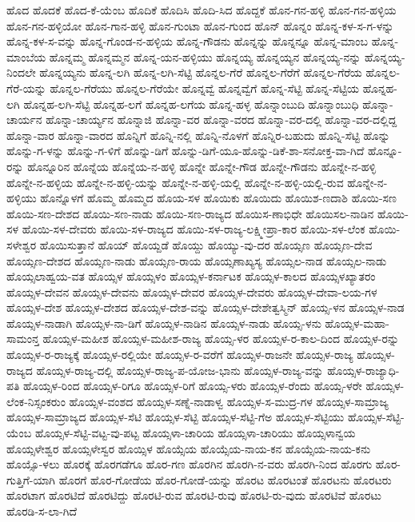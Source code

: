 ಹೊದ
ಹೊದಕೆ
ಹೊದ-ಕೆ-ಯೆಂಬ
ಹೊದಿಕೆ
ಹೊದಿಸಿ
ಹೊದಿ-ಸಿದ
ಹೊದ್ದಕೆ
ಹೊನ-ಗನ-ಹಳ್ಳಿ
ಹೊನ-ಗನ-ಹಳ್ಳಿಯ
ಹೊನ-ಗನ-ಹಳ್ಳಿಯೋ
ಹೊನ-ಗಾನ-ಹಳ್ಳಿ
ಹೊನ-ಗುಂಟಾ
ಹೊನ-ಗುಂದ
ಹೊನ್
ಹೊನ್ನಂ
ಹೊನ್ನ-ಕಳ-ಸ-ಗ-ಳನ್ನು
ಹೊನ್ನ-ಕಳ-ಸ-ವನ್ನು
ಹೊನ್ನ-ಗೊಂಡ-ನ-ಹಳ್ಳಿಯ
ಹೊನ್ನ-ಗೌಡನು
ಹೊನ್ನನ್ನು
ಹೊನ್ನನ್ನೂ
ಹೊನ್ನ-ಮಾಂಬ
ಹೊನ್ನ-ಮಾಂಬೆಯ
ಹೊನ್ನಮ್ಮ
ಹೊನ್ನಮ್ಮನ
ಹೊನ್ನ-ಯನ-ಹಳ್ಳಿಯು
ಹೊನ್ನಯ್ಯ
ಹೊನ್ನಯ್ಯನ
ಹೊನ್ನಯ್ಯ-ನನ್ನು
ಹೊನ್ನಯ್ಯ-ನಿಂದಲೇ
ಹೊನ್ನಯ್ಯನು
ಹೊನ್ನ-ಲಗಿ
ಹೊನ್ನ-ಲಗಿ-ಸೆಟ್ಟಿ
ಹೊನ್ನಲ-ಗೆರೆ
ಹೊನ್ನಲ-ಗೆರೆಗೆ
ಹೊನ್ನಲ-ಗೆರೆಯ
ಹೊನ್ನಲ-ಗೆರೆ-ಯನ್ನು
ಹೊನ್ನಲ-ಗೆರೆಯು
ಹೊನ್ನಲ-ಗೆರೆಯೇ
ಹೊನ್ನವ್ವೆ
ಹೊನ್ನವ್ವೆಗೆ
ಹೊನ್ನ-ಸೆಟ್ಟಿ
ಹೊನ್ನ-ಸೆಟ್ಟಿಯ
ಹೊನ್ನಹ-ಲಗಿ
ಹೊನ್ನಹ-ಲಗಿ-ಸೆಟ್ಟಿ
ಹೊನ್ನಹ-ಲಗೆ
ಹೊನ್ನಹ-ಲಗೆಯ
ಹೊನ್ನ-ಹಳ್ಳ
ಹೊನ್ನಾಂಬುದಿ
ಹೊನ್ನಾಂಬುಧಿ
ಹೊನ್ನಾ-ಚಾರ್ಯನ
ಹೊನ್ನಾ-ಚಾರ್ಯ್ಯನ
ಹೊನ್ನಾಜಿ
ಹೊನ್ನಾ-ವರ
ಹೊನ್ನಾ-ವರದ
ಹೊನ್ನಾ-ವರ-ದಲ್ಲಿ
ಹೊನ್ನಾ-ವರ-ದಲ್ಲಿದ್ದ
ಹೊನ್ನಾ-ವಾರ
ಹೊನ್ನಾ-ವಾರದ
ಹೊನ್ನಿಗೆ
ಹೊನ್ನಿ-ನಲ್ಲಿ
ಹೊನ್ನಿ-ನೊಳಗೆ
ಹೊನ್ನಿರ-ಬಹುದು
ಹೊನ್ನಿ-ಸೆಟ್ಟಿ
ಹೊನ್ನು
ಹೊನ್ನು-ಗ-ಳನ್ನು
ಹೊನ್ನು-ಗ-ಳಿಗೆ
ಹೊನ್ನು-ಡಿಗೆ
ಹೊನ್ನು-ಡಿಗೆ-ಯೂ-ಹೊನ್ನು-ಡಿಕೆ-ಶಾ-ಸನೋಕ್ತ-ವಾ-ಗಿದೆ
ಹೊನ್ನೂ-ರನ್ನು
ಹೊನ್ನೂರಿನ
ಹೊನ್ನೆಯ
ಹೊನ್ನೆಯ-ನ-ಹಳ್ಳಿ
ಹೊನ್ನೇ
ಹೊನ್ನೇ-ಗೌಡ
ಹೊನ್ನೇ-ಗೌಡನು
ಹೊನ್ನೇ-ನ-ಹಳ್ಳಿ
ಹೊನ್ನೇ-ನ-ಹಳ್ಳಿಯ
ಹೊನ್ನೇ-ನ-ಹಳ್ಳಿ-ಯನ್ನು
ಹೊನ್ನೇ-ನ-ಹಳ್ಳಿ-ಯಲ್ಲಿ
ಹೊನ್ನೇ-ನ-ಹಳ್ಳಿ-ಯಲ್ಲಿ-ರುವ
ಹೊನ್ನೇ-ನ-ಹಳ್ಳಿಯು
ಹೊನ್ನೊಳಗೆ
ಹೊಮ್ಮ
ಹೊಮ್ಮದ
ಹೊಯ-ಸಳ
ಹೊಯಿಕು
ಹೊಯಿದು
ಹೊಯಿಶ-ಣದಾಶಿ
ಹೊಯಿ-ಸಣ
ಹೊಯಿ-ಸಣ-ದೇಶದ
ಹೊಯಿ-ಸಣ-ನಾಡು
ಹೊಯಿ-ಸಣ-ರಾಜ್ಯದ
ಹೊಯಿಸ-ಣಾಭಿಧೇ
ಹೊಯಿಸಲ-ನಾಡಿನ
ಹೊಯಿ-ಸಳ
ಹೊಯಿ-ಸಳ-ದೇವರು
ಹೊಯಿ-ಸಳ-ರಾಜ್ಯದ
ಹೊಯಿ-ಸಳ-ರಾಜ್ಯ-ಲಕ್ಷ್ಮೀಪ್ರಾ-ಕಾರ
ಹೊಯಿ-ಸಳ-ಲೆಂಕ
ಹೊಯಿ-ಸಳೇಶ್ವರ
ಹೊಯಿಸುತ್ತಾನೆ
ಹೊಯ್
ಹೊಯ್ದಡೆ
ಹೊಯ್ದು
ಹೊಯ್ಯು-ವು-ದರ
ಹೊಯ್ಸಣ
ಹೊಯ್ಸಣ-ದೇವ
ಹೊಯ್ಸಣ-ದೇಶದ
ಹೊಯ್ಸಣ-ನಾಡು
ಹೊಯ್ಸಣ-ರಾಯ
ಹೊಯ್ಸಣಾಖ್ಯಸ್ಯ
ಹೊಯ್ಸಲ-ನಾಡ
ಹೊಯ್ಸಲ-ನಾಡು
ಹೊಯ್ಸಲಾಹ್ವಯ-ವತ
ಹೊಯ್ಸಳ
ಹೊಯ್ಸಳಂ
ಹೊಯ್ಸಳ-ಕರ್ನಾಟಕ
ಹೊಯ್ಸಳ-ಕಾಲದ
ಹೊಯ್ಸಳಖ್ಯಾತರಂ
ಹೊಯ್ಸಳ-ದೇವನ
ಹೊಯ್ಸಳ-ದೇವನು
ಹೊಯ್ಸಳ-ದೇವರ
ಹೊಯ್ಸಳ-ದೇವರು
ಹೊಯ್ಸಳ-ದೇವಾ-ಲಯ-ಗಳ
ಹೊಯ್ಸಳ-ದೇಶ
ಹೊಯ್ಸಳ-ದೇಶದ
ಹೊಯ್ಸಳ-ದೇಶ-ವನ್ನು
ಹೊಯ್ಸಳ-ದೇಶೇತ್ವಸ್ಮಿನ್
ಹೊಯ್ಸ-ಳನ
ಹೊಯ್ಸಳ-ನಾಡ
ಹೊಯ್ಸಳ-ನಾಡಾಗಿ
ಹೊಯ್ಸಳ-ನಾ-ಡಿಗೆ
ಹೊಯ್ಸಳ-ನಾಡಿನ
ಹೊಯ್ಸಳ-ನಾಡು
ಹೊಯ್ಸ-ಳನು
ಹೊಯ್ಸಳ-ಮಹಾ-ಸಾಮಂನ್ತ
ಹೊಯ್ಸಳ-ಮಹೀಶ
ಹೊಯ್ಸಳ-ಮಹೀಶ-ರಾಜ್ಯ
ಹೊಯ್ಸ-ಳರ
ಹೊಯ್ಸಳ-ರ-ಕಾಲ-ದಿಂದ
ಹೊಯ್ಸಳ-ರನ್ನು
ಹೊಯ್ಸಳ-ರ-ರಾಜ್ಯಕ್ಕೆ
ಹೊಯ್ಸಳ-ರಲ್ಲಿಯೇ
ಹೊಯ್ಸಳ-ರ-ವರೆಗೆ
ಹೊಯ್ಸಳ-ರಾಜನೇ
ಹೊಯ್ಸಳ-ರಾಜ್ಯ
ಹೊಯ್ಸಳ-ರಾಜ್ಯದ
ಹೊಯ್ಸಳ-ರಾಜ್ಯ-ದಲ್ಲಿ
ಹೊಯ್ಸಳ-ರಾಜ್ಯ-ಪ-ಯೋಜ-ಭಾನು
ಹೊಯ್ಸಳ-ರಾಜ್ಯ-ವನ್ನು
ಹೊಯ್ಸಳ-ರಾಜ್ಯಾಧಿ-ಪತಿ
ಹೊಯ್ಸಳ-ರಿಂದ
ಹೊಯ್ಸಳ-ರಿಗೂ
ಹೊಯ್ಸಳ-ರಿಗೆ
ಹೊಯ್ಸ-ಳರು
ಹೊಯ್ಸಳ-ರೆಂದು
ಹೊಯ್ಸ-ಳರೇ
ಹೊಯ್ಸಳ-ಲೆಂಕ-ನಿಸ್ಸಂಕರುಂ
ಹೊಯ್ಸಳ-ವಂಶದ
ಹೊಯ್ಸಳ-ಸಣ್ನೆ-ನಾಡಾಳ್ವ
ಹೊಯ್ಸಳ-ಸ-ಮುದ್ರ-ಗಳ
ಹೊಯ್ಸಳ-ಸಾಮ್ರಾಜ್ಯ
ಹೊಯ್ಸಳ-ಸಾಮ್ರಾಜ್ಯದ
ಹೊಯ್ಸಳ-ಸೆಟಿ
ಹೊಯ್ಸಳ-ಸೆಟ್ಟಿ
ಹೊಯ್ಸಳ-ಸೆಟ್ಟಿ-ಗೆಅ
ಹೊಯ್ಸಳ-ಸೆಟ್ಟಿಯು
ಹೊಯ್ಸಳ-ಸೆಟ್ಟಿ-ಯೆಂಬ
ಹೊಯ್ಸಳ-ಸೆಟ್ಟಿ-ವಟ್ಟ-ವು-ಪಟ್ಟ
ಹೊಯ್ಸಳಾ-ಚಾರಿಯ
ಹೊಯ್ಸಳಾ-ಚಾರಿಯು
ಹೊಯ್ಸಳಾನ್ವಯ
ಹೊಯ್ಸಳೇಶ್ವರ
ಹೊಯ್ಸಳೇಸ್ವರ
ಹೊಯ್ಸಿಳ
ಹೊಯ್ಸೆಯ
ಹೊಯ್ಸೆಯ-ನಾಯ-ಕನ
ಹೊಯ್ಸೆಯ-ನಾಯ-ಕನು
ಹೊಯ್ಸೊ-ಳಲು
ಹೊರಕ್ಕೆ
ಹೊರಗಡೆಗೂ
ಹೊರ-ಗಣ
ಹೊರಗಿನ
ಹೊರಗಿ-ನ-ವರು
ಹೊರಗಿ-ನಿಂದ
ಹೊರಗು
ಹೊರ-ಗುತ್ತಿಗೆ-ಯಾಗಿ
ಹೊರಗೆ
ಹೊರ-ಗೋಡೆಯ
ಹೊರ-ಗೋಡೆ-ಯನ್ನು
ಹೊರಟ
ಹೊರಟಂತೆ
ಹೊರಟನು
ಹೊರಟರು
ಹೊರಟಾಗ
ಹೊರಟಿದೆ
ಹೊರಟಿದ್ದು
ಹೊರಟಿ-ರುವ
ಹೊರಟಿ-ರುವು
ಹೊರಟಿ-ರು-ವುದು
ಹೊರಟಿವೆ
ಹೊರಟು
ಹೊರಡಿ-ಸ-ಲಾ-ಗಿದೆ
